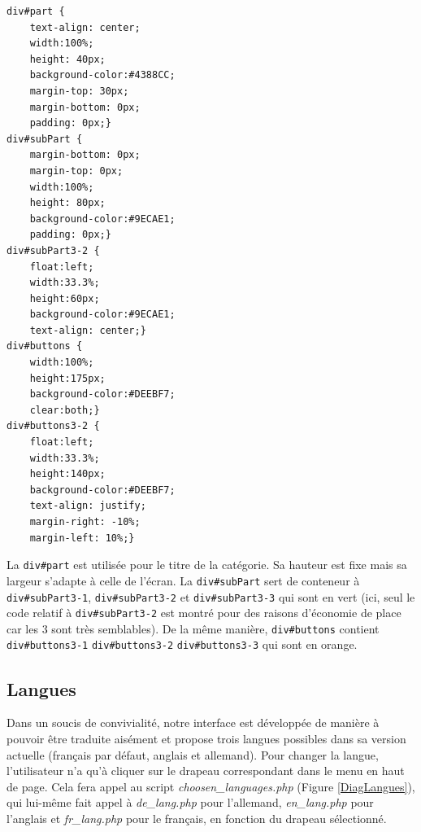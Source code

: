 \begin{DDbox}{\linewidth}
\begin{lstlisting}
div#part {
 	text-align: center;
	width:100%;
	height: 40px;
	background-color:#4388CC;
	margin-top: 30px;
	margin-bottom: 0px;
	padding: 0px;}
div#subPart {
	margin-bottom: 0px;
	margin-top: 0px;
	width:100%;
	height: 80px;
	background-color:#9ECAE1;
	padding: 0px;}
div#subPart3-2 {
	float:left;
	width:33.3%;
	height:60px;
	background-color:#9ECAE1;
	text-align: center;}
div#buttons {
	width:100%;
	height:175px;
	background-color:#DEEBF7;
	clear:both;}
div#buttons3-2 {
	float:left;
	width:33.3%;
	height:140px;
	background-color:#DEEBF7;
	text-align: justify;
	margin-right: -10%;
	margin-left: 10%;}
\end{lstlisting}
\end{DDbox}

La \texttt{div\#part} est utilisée pour le titre de la catégorie. Sa hauteur est fixe mais sa largeur s'adapte à celle de l'écran. La \texttt{div\#subPart} sert de conteneur à \texttt{div\#subPart3-1}, \texttt{div\#subPart3-2} et \texttt{div\#subPart3-3}  qui sont en vert (ici, seul le code relatif à \texttt{div\#subPart3-2} est montré pour des raisons d'économie de place car les 3 sont très semblables). De la même manière, \texttt{div\#buttons} contient \texttt{div\#buttons3-1} \texttt{div\#buttons3-2} \texttt{div\#buttons3-3} qui sont en orange. 

\subsection{Langues}
Dans un soucis de convivialité, notre interface est développée de manière à pouvoir être traduite aisément et propose trois langues possibles dans sa version actuelle (français par défaut, anglais et allemand). Pour changer la langue, l'utilisateur n'a qu'à cliquer sur le drapeau correspondant dans le menu en haut de page. Cela fera appel au script \emph{choosen\_languages.php} (Figure \ref{DiagLangues}), qui lui-même fait appel à \emph{de\_lang.php} pour l'allemand, \emph{en\_lang.php} pour l'anglais et \emph{fr\_lang.php} pour le français, en fonction du drapeau sélectionné. \\

